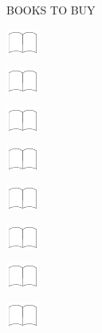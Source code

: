 \documentclass[11pt,titlepage]{article}
\begin{document}
\pagebreak

\small %
\hfill BOOKS TO BUY

\vspace{6mm}

\noindent
\includegraphics[]{book.pdf}

\vspace{12mm}

\noindent
\includegraphics[]{book.pdf}

\vspace{12mm}

\noindent
\includegraphics[]{book.pdf}

\vspace{12mm}

\noindent
\includegraphics[]{book.pdf}

\vspace{12mm}

\noindent
\includegraphics[]{book.pdf}

\vspace{12mm}

\noindent
\includegraphics[]{book.pdf}

\vspace{12mm}

\noindent
\includegraphics[]{book.pdf}

\vspace{12mm}

\noindent
\includegraphics[]{book.pdf}
\end{document}
